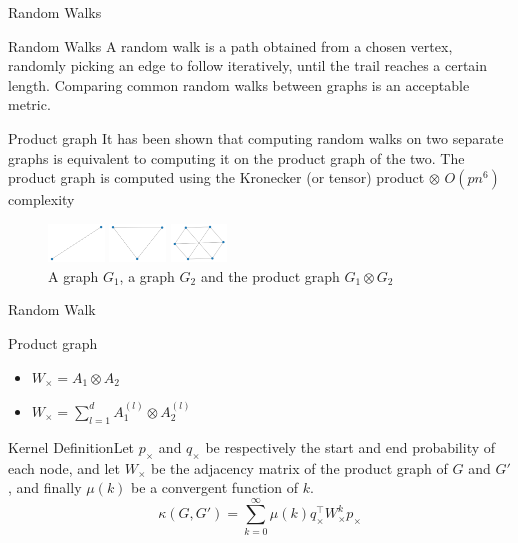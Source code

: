 \documentclass[compress]{beamer}
\begin{document}
\begin{frame}{Random Walks}
\begin{block}{Random Walks}
	A random walk is a path obtained from a chosen vertex, randomly picking an edge to follow iteratively, until the trail reaches a certain length.
	Comparing common random walks between graphs is an acceptable metric.
\end{block}
\begin{block}{Product graph}
It has been shown\cite{imrich2000product} that computing random walks on two separate graphs is equivalent to computing it on the product graph of the two. The product graph is computed using the Kronecker (or tensor) product $\otimes$
$O(pn^6)$ complexity
\end{block}
\begin{figure}
\begin{multicols}{3}
\includegraphics[width=1.5cm]{data/prod_graph/g1.png}\par
\includegraphics[width=1.5cm]{data/prod_graph/g2.png}\par
\includegraphics[width=1.5cm]{data/prod_graph/gx.png}\par
\end{multicols}
\caption{A graph $G_1$, a graph $G_2$ and the product graph $G_1 \otimes G_2$}
\end{figure}
\end{frame}
\begin{frame}{Random Walk}
	\begin{block}{Product graph}
		\begin{multicols}{2}
			\begin{itemize}
				\item $W_{\times}=A_1\otimes A_2$
				\item 
				$W_{\times}=\sum\limits_{l=1}^{d} A_1^{(l)} \otimes A_2^{(l)}$\\
			\end{itemize}
		\end{multicols}
	\end{block}
	\begin{block}{Kernel Definition}Let $p_{\times}$ and $q_{\times}$ be respectively the start and end probability of each node, and let $W_{\times}$ be the adjacency matrix of the product graph of $G$ and $G'$, and finally $\mu(k)$ be a convergent function of $k$.
		\begin{equation*}
		\kappa(G,G') = \sum\limits_{k=0}^{\infty}\mu(k)q_{\times}^{\top}W_{\times}^{k}p_{\times}
		\end{equation*}
	\end{block}
\end{frame}
\end{document}
